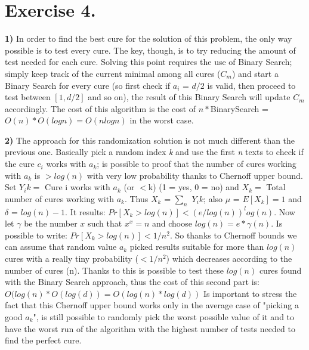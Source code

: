 \documentclass[11pt]{scrartcl}
\begin{document}
\newpage

\section*{Exercise 4.} \textbf{1)} In order to find the best cure for the solution of this problem, the only way possible is to test every cure. The key, though, is to try reducing the amount of test needed for each cure. Solving this point requires the use of Binary Search; simply keep track of the current minimal among all cures ($C_m$) and start a Binary Search for every cure (so first check if $a_i$ = $d/2$ is valid, then proceed to test between $[1,d/2]$ and so on), the result of this Binary Search will update $C_m$ accordingly.
The cost of this algorithm is the cost of $n*$BinarySearch = $O(n) * O(logn) = O(nlogn)$ in the worst case. \newline

\noindent
\textbf{2)} The approach for this randomization solution is not much different than the previous one. Basically pick a random index \textit{k} and use the first \textit{n} texts to check if the cure $c_i$ works with $a_k$; is possible to proof that the number of cures working with $a_k$ is $>log(n)$ with very low probability thanks to Chernoff upper bound. Set $Y_ik =$ Cure i works with $a_k$ (or $< $k) (1 = yes, 0 = no) and  $X_k =$ Total number of cures working with $a_k$. Thus $X_k$ = $\sum_n$ $Y_ik$; also $\mu$ = $E[X_k] = 1$ and $\delta$ = $log(n) - 1$. It results: $Pr[X_k > log(n)] < (e/log(n))^log(n)$. Now let $\gamma$ be the number $x$ such that $x^x = n$ and choose $log(n) = e * \gamma(n)$. Is possible to write: $Pr[X_k > log(n)] < 1/n^2$. \newline
So thanks to Chernoff bounds we can assume that random value $a_k$ picked results suitable for more than $log(n)$ cures with a really tiny probability ($< 1/n^2$) which decreases according to the number of cures (n). \newline
Thanks to this is possible to test these $log(n)$ cures found with the Binary Search approach, thus the cost of this second part is: $O(log(n) * O(log(d)) = O(log(n)*log(d))$ \newline
Is important to stress the fact that this Chernoff upper bound works only in the average case of "picking a good $a_k$", is still possible to randomly pick the worst possible value of it and to have the worst run of the algorithm with the highest number of tests needed to find the perfect cure.
\end{document}
